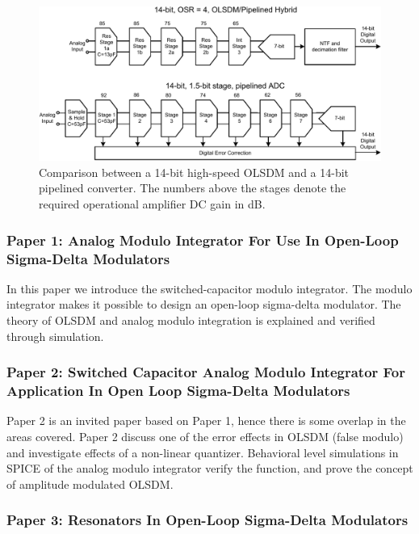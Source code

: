 \begin{figure}[htbp]
\centerline{ \includegraphics[width=\myfigwidthm]{graphics/olsdmvspipe}}
  \caption{Comparison between a 14-bit high-speed OLSDM and a 14-bit
    pipelined converter. The numbers above the stages denote the
    required operational amplifier
    DC gain in dB.}
  \label{fig:olsdmvspipe}
\end{figure}


\subsubsection{Paper 1: Analog Modulo Integrator For Use In Open-Loop Sigma-Delta
  Modulators}

In this paper we introduce the switched-capacitor modulo
integrator. The modulo integrator makes it possible to design an
open-loop sigma-delta modulator. The theory of OLSDM and
analog modulo integration is explained and verified through simulation.


\subsubsection{Paper 2: Switched Capacitor Analog Modulo Integrator For Application
  In Open Loop Sigma-Delta Modulators}
Paper 2 is an invited paper based on Paper 1, hence there is some
overlap in the areas covered. Paper 2 discuss one of the error effects
in OLSDM (false modulo) and investigate effects of a non-linear
quantizer.
Behavioral level simulations in SPICE of the analog modulo
integrator verify the function, and prove the concept of
amplitude modulated OLSDM.




\subsubsection{Paper 3: Resonators In Open-Loop Sigma-Delta Modulators}

